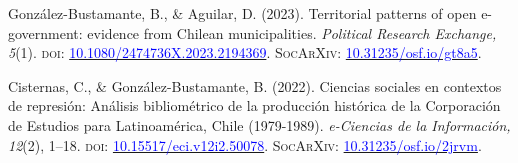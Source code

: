 \begin{publications}

\begin{benumerate}{10}

\item{González-Bustamante, B., \& Aguilar, D. (2023). Territorial patterns of open e-government: evidence from Chilean municipalities. {\itshape Political Research Exchange, 5}(1). {\scshape doi:} \href{https://doi.org/10.1080/2474736X.2023.2194369}{\textcolor{blue}{10.1080/2474736X.2023.2194369}}. {\scshape \footnotesize SocArXiv:} \href{https://doi.org/10.31235/osf.io/gt8a5}{\textcolor{blue}{10.31235/osf.io/gt8a5}}.}\vspace{1mm}


\item{Cisternas, C., \& González-Bustamante, B. (2022). Ciencias sociales en contextos de represión: Análisis bibliométrico de la producción histórica de la Corporación de Estudios para Latinoamérica, Chile (1979-1989). {\itshape e-Ciencias de la Información, 12}(2), 1--18. {\scshape doi:} \href{https://doi.org/10.15517/eci.v12i2.50078}{\textcolor{blue}{10.15517/eci.v12i2.50078}}. {\scshape \footnotesize SocArXiv:} \href{https://doi.org/10.31235/osf.io/2jrvm}{\textcolor{blue}{10.31235/osf.io/2jrvm}}.}\vspace{1mm} %



\end{benumerate}
\end{publications}
